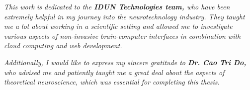 \begin{dedication}

    \textit{This work is dedicated to the \textbf{IDUN Technologies team,} who have been extremely helpful in my journey into the neurotechnology industry. They taught me a lot about working in a scientific setting and allowed me to investigate various aspects of non-invasive brain-\break computer interfaces in combination with cloud computing and web development.}

    \hfill \break

    \textit{Additionally, I would like to express my sincere gratitude to \textbf{Dr. Cao Tri Do,} who advised me and patiently taught me a great deal about the aspects of theoretical neuroscience, which was essential for completing this thesis.}

\end{dedication}
